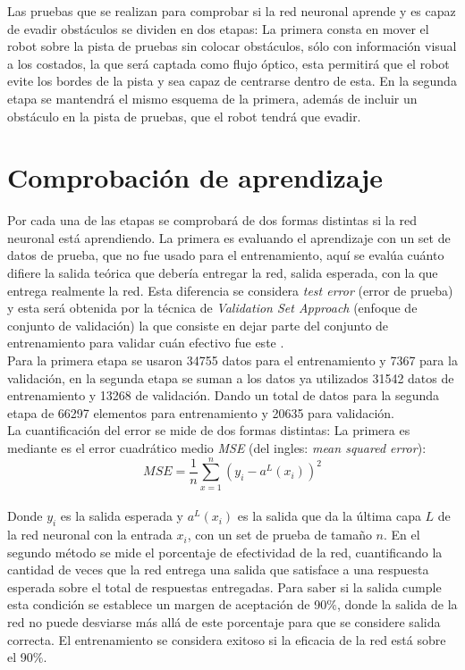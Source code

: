 \documentclass{iccmemoria}
\begin{document}
Las pruebas que se realizan para comprobar si la red neuronal aprende y es capaz de evadir obstáculos se dividen en dos etapas: La primera consta en mover el robot sobre la pista de pruebas sin colocar obstáculos, sólo con información visual a los costados, la que será captada como flujo óptico, esta permitirá que el robot evite los bordes de la pista y sea capaz de centrarse dentro de esta. En la segunda etapa se mantendrá el mismo esquema de la primera, además de incluir un obstáculo en la pista de pruebas, que el robot tendrá que evadir.\\

\section{Comprobación de aprendizaje}

Por cada una de las etapas se comprobará de dos formas distintas si la red neuronal está aprendiendo. La primera es evaluando el aprendizaje con un set de datos de prueba, que no fue usado para el entrenamiento, aquí se evalúa cuánto difiere la salida teórica que debería entregar la red, salida esperada, con la que entrega realmente la red. Esta diferencia se considera \emph{test error} (error de prueba) y esta será obtenida por la técnica de \emph{Validation Set Approach} (enfoque de conjunto de validación) la que consiste en dejar parte del conjunto de entrenamiento para validar cuán efectivo fue este \cite{james2014introduction}.\\

Para la primera etapa se usaron 34755 datos para el entrenamiento y 7367 para la validación, en la segunda etapa se suman a los datos ya utilizados 31542 datos de entrenamiento y 13268 de validación. Dando un total de datos para la segunda etapa de 66297 elementos para entrenamiento y 20635 para validación.\\
 
La cuantificación del error se mide de dos formas distintas: La primera es mediante es el error cuadrático medio \emph{MSE} (del ingles: \emph{mean squared error}):\\

\begin{equation}
	MSE = \frac{1}{n} \sum^n_{x=1} (y_i-a^L(x_i))^2
\end{equation}\\

Donde $y_i$ es la salida esperada y $a^L(x_i)$ es la salida que da la última capa $L$ de la red neuronal con la entrada $x_i$, con un set de prueba de tamaño $n$. En el segundo método se mide el porcentaje de efectividad de la red, cuantificando la cantidad de veces que la red entrega una salida que satisface a una respuesta esperada sobre el total de respuestas entregadas. Para saber si la salida cumple esta condición se establece un margen de aceptación de 90$\%$, donde la salida de la red no puede desviarse más allá de este porcentaje para que se considere salida correcta. El entrenamiento se considera exitoso si la eficacia de la red está sobre el 90$\%$.\\
 
\end{document}

